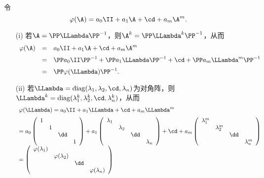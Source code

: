 \begin{jielun}
  令
  $$
  \varphi(\A) = a_0 \II + a_1 \A + \cd + a_m \A^m.
  $$
  \begin{itemize}
  \item[(i)]
    若$\A = \PP \LLambda \PP^{-1}$，则$\A^k = \PP \LLambda^k \PP^{-1}$，从而
    $$
    \begin{array}{rcl}
      \varphi(\A) &=& a_0 \II + a_1 \A + \cd + a_m \A^m \\[0.2cm]
                  &=& \PP a_0 \II \PP^{-1} + \PP a_1 \LLambda\PP^{-1} + \cd + \PP a_m \LLambda^m \PP^{-1} \\[0.2cm]
                  &=& \PP \varphi(\LLambda) \PP^{-1}.
    \end{array}
    $$
  \item[(ii)] 若$\LLambda=\mathrm{diag}(\lambda_1,\lambda_2,\cd,\lambda_n)$为对角阵，则$\LLambda^k=\mathrm{diag}(\lambda_1^k,\lambda_2^k,\cd,\lambda_n^k)$，从而
    $$
    \begin{array}{l}
      \varphi(\LLambda) = a_0 \II + a_1 \LLambda + \cd + a_m \LLambda^m \\[0.2cm]
      =  a_0 \left(
      \begin{array}{cccc}
        1 & & &\\
          & 1 & & \\
          & & \dd & \\
          & & & 1
      \end{array}
                \right)
                + a_1 \left(
                \begin{array}{cccc}
                  \lambda_1 & & &\\
                            & \lambda_2 & & \\
                            & & \dd & \\
                            & & & \lambda_n
                \end{array}
                                  \right) + \cd +  a_m \left(
                                  \begin{array}{cccc}
                                    \lambda_1^m & & &\\
                                                & \lambda_2^m & & \\
                                                & & \dd & \\
                                                & & & \lambda_n^m
                                  \end{array}
                                                      \right)  \\[0.6cm]
      =\left(
      \begin{array}{cccc}
        \varphi(\lambda_1) & & &\\
                           & \varphi(\lambda_2) & & \\
                           & & \dd & \\
                           & & & \varphi(\lambda_n)
      \end{array}
                                 \right)
    \end{array}
    $$
  \end{itemize}


\end{jielun}



% 

